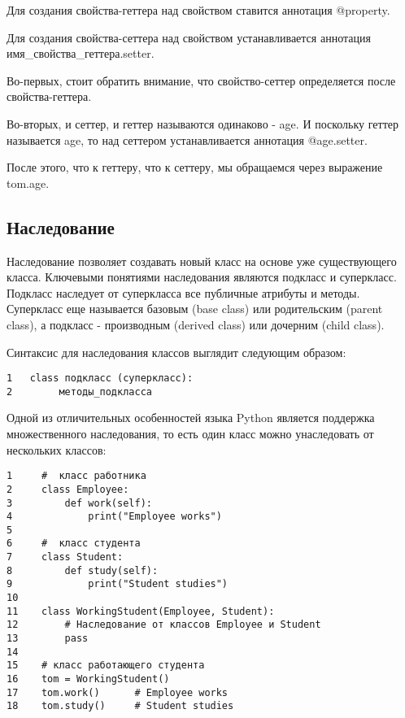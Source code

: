 \documentclass[12pt, a4paper]{article}
\begin{document}
Для создания свойства-геттера над свойством ставится аннотация @property.

Для создания свойства-сеттера над свойством устанавливается аннотация имя\_свойства\_геттера.setter.

\vspace{1em}

Во-первых, стоит обратить внимание, что свойство-сеттер определяется после свойства-геттера.

Во-вторых, и сеттер, и геттер называются одинаково - age. И поскольку геттер называется age, то над сеттером устанавливается аннотация @age.setter.

После этого, что к геттеру, что к сеттеру, мы обращаемся через выражение tom.age.

\subsection{Наследование}

Наследование позволяет создавать новый класс на основе уже существующего класса.
Ключевыми понятиями наследования являются подкласс и суперкласс. Подкласс наследует от суперкласса все публичные атрибуты и методы. Суперкласс еще называется базовым (base class) или родительским (parent class), а подкласс - производным (derived class) или дочерним (child class).

\vspace{1em}

Синтаксис для наследования классов выглядит следующим образом:

\begin{verbatim}
1   class подкласс (суперкласс):
2        методы_подкласса
\end{verbatim}

Одной из отличительных особенностей языка Python является поддержка множественного наследования, то есть один класс можно унаследовать от нескольких классов:

\begin{verbatim}
1     #  класс работника
2     class Employee:
3         def work(self):
4             print("Employee works")
5      
6     #  класс студента
7     class Student:
8         def study(self):
9             print("Student studies")
10     
11    class WorkingStudent(Employee, Student):        
12        # Наследование от классов Employee и Student
13        pass
14     
15    # класс работающего студента
16    tom = WorkingStudent()
17    tom.work()      # Employee works
18    tom.study()     # Student studies
\end{verbatim}
\end{document}

